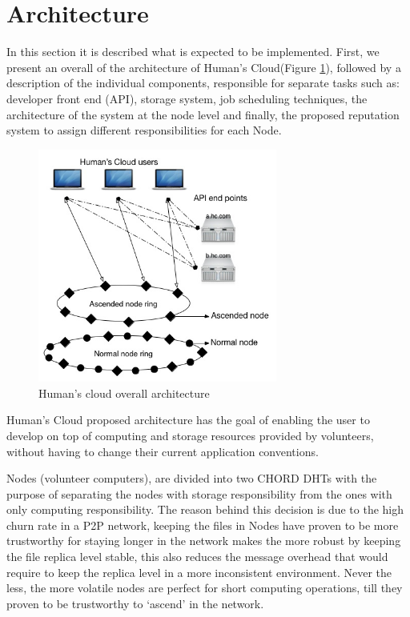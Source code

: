 \documentclass{./llncs2e/llncs}
\begin{document}

% 
% 

\section{Architecture}

In this section it is described what is expected to be implemented. First, we present an overall of the architecture of Human's Cloud(Figure \ref{fig:overallarchitecture}), followed by a description of the individual components, responsible for separate tasks such as: developer front end (API), storage system, job scheduling techniques, the architecture of the system at the node level and finally, the proposed reputation system to assign different responsibilities for each Node.

\begin{figure}[h!]
  \centering
  \includegraphics[width=0.7\textwidth]{img/overall.jpg}
  \caption{Human's cloud overall architecture}
  \label{fig:overallarchitecture}
\end{figure}

Human's Cloud proposed architecture has the goal of enabling the user to develop on top of computing and storage resources provided by volunteers, without having to change their current application conventions. 

Nodes (volunteer computers), are divided into two CHORD DHTs with the purpose of separating the nodes with storage responsibility from the ones with only computing responsibility. The reason behind this decision is due to the high churn rate in a P2P network, keeping the files in Nodes have proven to be more trustworthy for staying longer in the network makes the more robust by keeping the file replica level stable, this also reduces the message overhead that would require to keep the replica level in a more inconsistent environment. Never the less, the more volatile nodes are perfect for short computing operations, till they proven to be trustworthy to `ascend' in the network.
\end{document}
